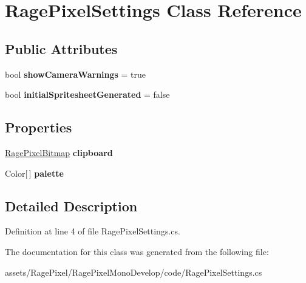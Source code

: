 \hypertarget{class_rage_pixel_settings}{\section{Rage\-Pixel\-Settings Class Reference}
\label{class_rage_pixel_settings}
}
\subsection*{Public Attributes}
\begin{DoxyCompactItemize}
\item 
\hypertarget{class_rage_pixel_settings_a5d3df988086621df8c6e9014b3f231d2}{bool {\bfseries show\-Camera\-Warnings} = true}\label{class_rage_pixel_settings_a5d3df988086621df8c6e9014b3f231d2}

\item 
\hypertarget{class_rage_pixel_settings_a6cc1e2c3f456101612e7b6ab64060867}{bool {\bfseries initial\-Spritesheet\-Generated} = false}\label{class_rage_pixel_settings_a6cc1e2c3f456101612e7b6ab64060867}

\end{DoxyCompactItemize}
\subsection*{Properties}
\begin{DoxyCompactItemize}
\item 
\hypertarget{class_rage_pixel_settings_ae2592aea0fd3c827af2c9b0dacb22ede}{\hyperlink{class_rage_pixel_bitmap}{Rage\-Pixel\-Bitmap} {\bfseries clipboard}}\label{class_rage_pixel_settings_ae2592aea0fd3c827af2c9b0dacb22ede}

\item 
\hypertarget{class_rage_pixel_settings_ac3e79e91a0c9142618bcdf4281adb1d5}{Color\mbox{[}$\,$\mbox{]} {\bfseries palette}}\label{class_rage_pixel_settings_ac3e79e91a0c9142618bcdf4281adb1d5}

\end{DoxyCompactItemize}


\subsection{Detailed Description}


Definition at line 4 of file Rage\-Pixel\-Settings.\-cs.



The documentation for this class was generated from the following file\-:\begin{DoxyCompactItemize}
\item 
assets/\-Rage\-Pixel/\-Rage\-Pixel\-Mono\-Develop/code/Rage\-Pixel\-Settings.\-cs\end{DoxyCompactItemize}

